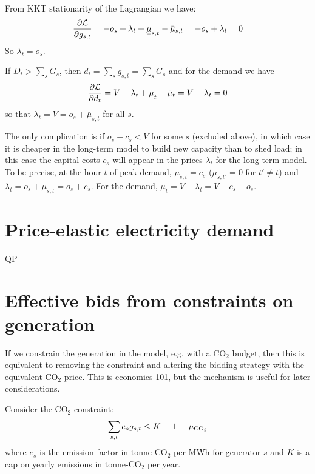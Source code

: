 \documentclass[final,3p,times]{elsarticle}
\def\l{\lambda} \def\K{\kappa} \def\m{\mu} \def\G{\Gamma} \def\d{\partial}
\def\cL{\mathcal{L}} \newcommand{\ubar}[1]{\text{\b{$#1$}}}
\begin{document}
From KKT stationarity of the Lagrangian we have:
\begin{align}
  \frac{\d \cL}{\d g_{s,t}} =  -o_s + \l_t + \ubar{\mu}_{s,t} - \bar{\mu}_{s,t}  =  -o_s + \l_t = 0
\end{align}
So $\l_t = o_s$.

If $D_t > \sum_s G_{s}$, then $d_t = \sum_s g_{s,t} = \sum_s G_{s}$ and for the
demand we have
\begin{align}
  \frac{\d \cL}{\d d_{t}} =  V -\l_t + \ubar{\mu}_{t} - \bar{\mu}_{t}  =  V - \l_t = 0
\end{align}
so that $\l_t = V = o_s + \bar{\mu}_{s,t}$ for all $s$.

The only complication is if $o_s + c_s < V$ for some $s$ (excluded above), in
which case it is cheaper in the long-term model to build new capacity than to
shed load; in this case the capital costs $c_s$ will appear in the prices $\l_t$
for the long-term model. To be precise, at the hour $t$ of peak demand,
$\bar{\mu}_{s,t} = c_s$ ($\bar{\mu}_{s,t'} =0$ for $t' \neq t$) and $\l_t = o_s
+ \bar{\mu}_{s,t} = o_s + c_s$. For the demand, $\bar{\mu}_{t} = V - \l_t = V -
c_s - o_s$.


\section{Price-elastic electricity demand}

QP


\section{Effective bids from constraints on generation}\label{sec:effective}


If we constrain the generation in the model, e.g. with a CO$_2$ budget, then
this is equivalent to removing the constraint and altering the bidding strategy
with the equivalent CO$_2$ price. This is economics 101, but the mechanism is
useful for later considerations.

Consider the CO$_2$ constraint:
\begin{equation}
  \sum_{s,t} e_s g_{s,t} \leq K \hspace{0.34cm}\perp \hspace{0.34cm} \mu_{\textrm{CO}_2} \label{eq:co2}
\end{equation}
where $e_s$ is the emission factor in tonne-CO$_2$ per MWh\el{} for generator
$s$ and $K$ is a cap on yearly emissions in tonne-CO$_2$ per year.
\end{document}
